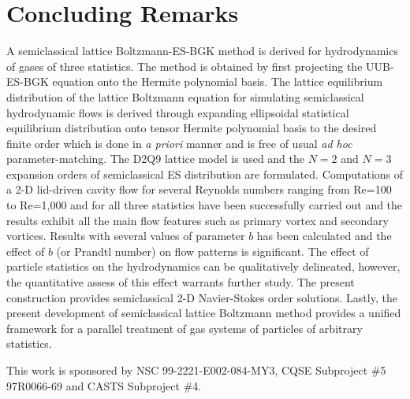 \documentclass[doublecol]{epl2}
\begin{document}
\section{Concluding Remarks}
A semiclassical lattice Boltzmann-ES-BGK method is derived for hydrodynamics of gases of three statistics. The method is obtained by first projecting the UUB-ES-BGK equation onto the Hermite polynomial basis.  The lattice equilibrium distribution of the lattice Boltzmann equation for simulating semiclassical hydrodynamic flows is derived through expanding ellipsoidal statistical equilibrium distribution onto tensor Hermite polynomial basis to the desired finite order which is done in {\sl a priori} manner and is free of usual {\sl ad hoc} parameter-matching. The D2Q9 lattice model is used and the $N=2$ and $N=3$ expansion orders of semiclassical ES distribution are formulated. Computations of a 2-D lid-driven cavity flow for several Reynolds numbers ranging from Re=100 to Re=1,000 and for all three statistics have been successfully carried out and the results exhibit all the main flow features such as primary vortex and secondary vortices. Results with several values of parameter $b$ has been calculated and the effect of $b$ (or Prandtl number) on flow patterns is significant.  The effect of particle statistics on the hydrodynamics can be qualitatively delineated, however, the quantitative assess of this effect warrants further study.  The present construction provides semiclassical 2-D Navier-Stokes order solutions. Lastly, the present development of semiclassical lattice Boltzmann method provides a unified framework for a parallel treatment of gas systems of particles of arbitrary statistics.

\acknowledgments
This work is sponsored by NSC 99-2221-E002-084-MY3, CQSE Subproject \#5 97R0066-69 and CASTS Subproject \#4.
\end{document}
